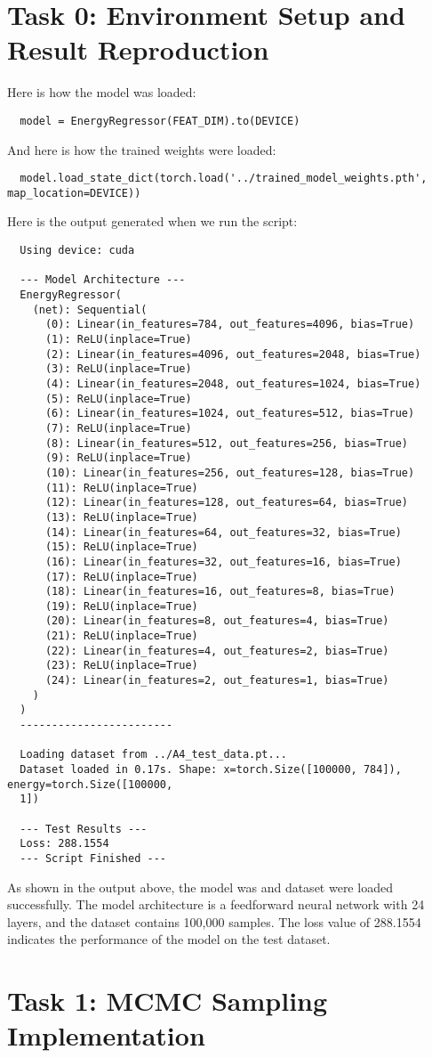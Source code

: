 \documentclass[a4paper,12pt]{article}
\title{\cooltitle{CS726 Programming Assignment -- 4 Report}}
\author{
\textbf{Saksham Rathi (22B1003)}\\
\textbf{Sharvanee Sonawane (22B0943)}\\
\textbf{Deeksha Dhiwakar (22B0988)}\\
\small Department of Computer Science, \\
Indian Institute of Technology Bombay \\}
\date{}
\begin{document}
\maketitle

\section*{Task 0: Environment Setup and Result Reproduction}
Here is how the model was loaded:
\begin{verbatim}
  model = EnergyRegressor(FEAT_DIM).to(DEVICE)
\end{verbatim}

And here is how the trained weights were loaded:
\begin{verbatim}
  model.load_state_dict(torch.load('../trained_model_weights.pth', map_location=DEVICE))
\end{verbatim}

Here is the output generated when we run the script:
\begin{verbatim}
  Using device: cuda

  --- Model Architecture ---
  EnergyRegressor(
    (net): Sequential(
      (0): Linear(in_features=784, out_features=4096, bias=True)
      (1): ReLU(inplace=True)
      (2): Linear(in_features=4096, out_features=2048, bias=True)
      (3): ReLU(inplace=True)
      (4): Linear(in_features=2048, out_features=1024, bias=True)
      (5): ReLU(inplace=True)
      (6): Linear(in_features=1024, out_features=512, bias=True)
      (7): ReLU(inplace=True)
      (8): Linear(in_features=512, out_features=256, bias=True)
      (9): ReLU(inplace=True)
      (10): Linear(in_features=256, out_features=128, bias=True)
      (11): ReLU(inplace=True)
      (12): Linear(in_features=128, out_features=64, bias=True)
      (13): ReLU(inplace=True)
      (14): Linear(in_features=64, out_features=32, bias=True)
      (15): ReLU(inplace=True)
      (16): Linear(in_features=32, out_features=16, bias=True)
      (17): ReLU(inplace=True)
      (18): Linear(in_features=16, out_features=8, bias=True)
      (19): ReLU(inplace=True)
      (20): Linear(in_features=8, out_features=4, bias=True)
      (21): ReLU(inplace=True)
      (22): Linear(in_features=4, out_features=2, bias=True)
      (23): ReLU(inplace=True)
      (24): Linear(in_features=2, out_features=1, bias=True)
    )
  )
  ------------------------
  
  Loading dataset from ../A4_test_data.pt...
  Dataset loaded in 0.17s. Shape: x=torch.Size([100000, 784]), energy=torch.Size([100000, 
  1])
  
  --- Test Results ---
  Loss: 288.1554
  --- Script Finished ---  
\end{verbatim}

As shown in the output above, the model was and dataset were loaded successfully. The model architecture is a feedforward neural network with 24 layers, and the dataset contains 100,000 samples. The loss value of 288.1554 indicates the performance of the model on the test dataset.

\section*{Task 1: MCMC Sampling Implementation}
\end{document}
